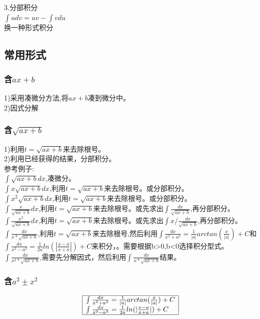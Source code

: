 \documentclass[fleqn]{article}
\begin{document}
\begin{flushleft}
		3.分部积分\\
		$\int udv=uv-\int vdu$\\
		换一种形式积分
	\subsection{常用形式}
		\subsubsection{含$ax+b$}
		1)采用凑微分方法,将$ax+b$凑到微分中。\\
		2)因式分解\\
		\subsubsection{含$\sqrt{ax+b}$}
		1)利用$t=\sqrt{ax+b}$来去除根号。\\
		2)利用已经获得的结果，分部积分。\\
		参考例子:\\
			$\int \sqrt{ax+b}dx$,凑微分。\\ 
			$\int x\sqrt{ax+b}dx$,利用$t=\sqrt{ax+b}$来去除根号。或分部积分。\\ 
			$\int x^2\sqrt{ax+b}dx$,利用$t=\sqrt{ax+b}$来去除根号。或分部积分。\\ 
			$\int \frac{x}{\sqrt{ax+b}}dx$,利用$t=\sqrt{ax+b}$来去除根号。或先求出$\int \frac{dx}{\sqrt{ax+b}}$,再分部积分。\\ 
			$\int \frac{x^2}{\sqrt{ax+b}}dx$,利用$t=\sqrt{ax+b}$来去除根号。或先求出$\int x/\frac{dx}{\sqrt{ax+b}}$,再分部积分。\\ 
			$\int \frac{dx}{x*\sqrt{ax+b}}$,利用$t=\sqrt{ax+b}$来去除根号,然后利用$\int\frac{dx}{x^2+a^2}=\frac{1}{|a|}arctan(\frac{x}{|a|})+C $和$\int\frac{dx}{x^2-a^2}=\frac{1}{2a}ln(|\frac{x-a}{x+a}|)+C$来积分，。需要根据b>0,b<0选择积分型式。\\ 
			$\int \frac{dx}{x^2*\sqrt{ax+b}}$,需要先分解因式，然后利用$\int \frac{dx}{x*\sqrt{ax+b}}$结果。\\

		\subsubsection{含$a^2 \pm x^2$}	
		\[
		\begin{array}{|l|}
			\hline
			\int\frac{dx}{x^2+a^2}=\frac{1}{|a|}arctan(\frac{x}{|a|})+C\\
			\int\frac{dx}{x^2-a^2}=\frac{1}{2a}ln(|\frac{x-a}{x+a}|)+C \\
			\hline
		\end{array}
		\]

\end{flushleft}
\end{document}
